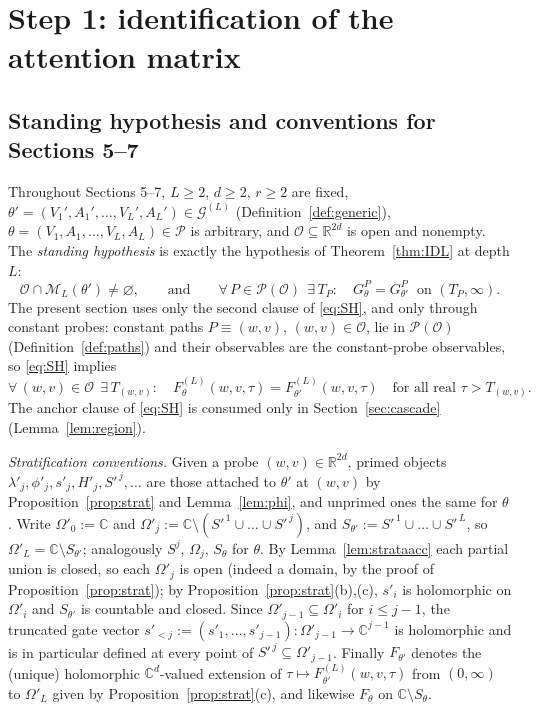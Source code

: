 \documentclass[11pt]{article}
\theoremstyle{definition}
\theoremstyle{remark}
\theoremstyle{plain}
\newcommand{\R}{\mathbb{R}}
\newcommand{\C}{\mathbb{C}}
\newcommand{\cO}{\mathcal{O}}
\newcommand{\cP}{\mathcal{P}}
\newcommand{\cM}{\mathcal{M}}
\newcommand{\cG}{\mathcal{G}}
\begin{document}
\section{Step 1: identification of the attention matrix}\label{sec:A1}

\subsection*{Standing hypothesis and conventions for Sections 5--7}
Throughout Sections 5--7, $L\ge2$, $d\ge2$, $r\ge2$ are fixed,
$\theta'=(V_1',A_1',\dots,V_L',A_L')\in\cG^{(L)}$ (Definition~\ref{def:generic}),
$\theta=(V_1,A_1,\dots,V_L,A_L)\in\cP$ is arbitrary, and $\cO\subseteq\R^{2d}$ is open and
nonempty.  The \emph{standing hypothesis} is exactly the hypothesis of
Theorem~\ref{thm:IDL} at depth $L$:
\begin{equation}\tag{SH}\label{eq:SH}
\cO\cap\cM_L(\theta')\neq\varnothing,\qquad\text{and}\qquad
\forall\,P\in\cP(\cO)\ \ \exists\,T_P:\quad G^P_\theta=G^P_{\theta'}
\ \text{ on }(T_P,\infty).
\end{equation}
The present section uses only the second clause of \eqref{eq:SH}, and only through
constant probes: constant paths $P\equiv(w,v)$, $(w,v)\in\cO$, lie in $\cP(\cO)$
(Definition~\ref{def:paths}) and their observables are the constant-probe observables, so
\eqref{eq:SH} implies
\begin{equation}\tag{H}\label{eq:H}
\forall\,(w,v)\in\cO\ \ \exists\,T_{(w,v)}:\quad
F^{(L)}_\theta(w,v,\tau)=F^{(L)}_{\theta'}(w,v,\tau)
\quad\text{for all real }\tau>T_{(w,v)} .
\end{equation}
The anchor clause of \eqref{eq:SH} is consumed only in Section~\ref{sec:cascade}
(Lemma~\ref{lem:region}).

\emph{Stratification conventions.}  Given a probe $(w,v)\in\R^{2d}$, primed objects
$\lambda'_j,\phi'_j,s'_j,H'_j,S'^{\,j},\dots$ are those attached to $\theta'$ at $(w,v)$
by Proposition~\ref{prop:strat} and Lemma~\ref{lem:phi}, and unprimed ones the same for
$\theta$.  Write $\Omega'_0:=\C$ and
$\Omega'_j:=\C\setminus(S'^{\,1}\cup\dots\cup S'^{\,j})$, and
$S_{\theta'}:=S'^{\,1}\cup\dots\cup S'^{\,L}$, so $\Omega'_L=\C\setminus S_{\theta'}$;
analogously $S^j$, $\Omega_j$, $S_\theta$ for $\theta$.  By Lemma~\ref{lem:strataacc}
each partial union is closed, so each $\Omega'_j$ is open (indeed a domain, by the proof
of Proposition~\ref{prop:strat}); by Proposition~\ref{prop:strat}(b),(c), $s'_i$ is
holomorphic on $\Omega'_i$ and $S_{\theta'}$ is countable and closed.  Since
$\Omega'_{j-1}\subseteq\Omega'_i$ for $i\le j-1$, the truncated gate vector
$s'_{<j}:=(s'_1,\dots,s'_{j-1}):\Omega'_{j-1}\to\C^{j-1}$ is holomorphic and is in
particular defined at every point of $S'^{\,j}\subseteq\Omega'_{j-1}$.  Finally
$F_{\theta'}$ denotes the (unique) holomorphic $\C^d$-valued extension of
$\tau\mapsto F^{(L)}_{\theta'}(w,v,\tau)$ from $(0,\infty)$ to $\Omega'_L$ given by
Proposition~\ref{prop:strat}(c), and likewise $F_\theta$ on $\C\setminus S_\theta$.
\end{document}
